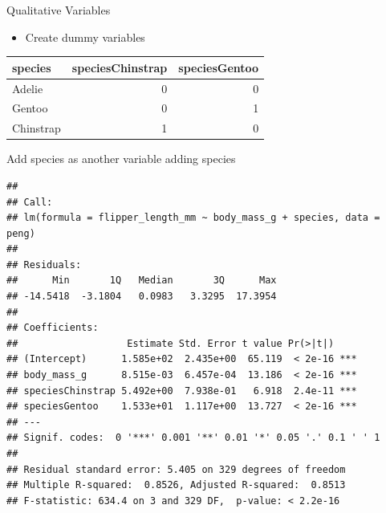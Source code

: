 \documentclass[
  ignorenonframetext,
]{beamer}
\providecommand{\tightlist}{%
  \setlength{\itemsep}{0pt}\setlength{\parskip}{0pt}}
\begin{document}
\begin{frame}{Qualitative Variables}
\protect\hypertarget{qualitative-variables}{}

\begin{itemize}
\tightlist
\item
  Create dummy variables
\end{itemize}

\begin{longtable}[]{@{}lrr@{}}
\toprule
species & speciesChinstrap & speciesGentoo\tabularnewline
\midrule
\endhead
Adelie & 0 & 0\tabularnewline
Gentoo & 0 & 1\tabularnewline
Chinstrap & 1 & 0\tabularnewline
\bottomrule
\end{longtable}

\end{frame}

\begin{frame}[fragile]{Add species as another variable \textbar{} adding
species}
\protect\hypertarget{add-species-as-another-variable-adding-species-1}{}

\begin{verbatim}
## 
## Call:
## lm(formula = flipper_length_mm ~ body_mass_g + species, data = peng)
## 
## Residuals:
##      Min       1Q   Median       3Q      Max 
## -14.5418  -3.1804   0.0983   3.3295  17.3954 
## 
## Coefficients:
##                   Estimate Std. Error t value Pr(>|t|)    
## (Intercept)      1.585e+02  2.435e+00  65.119  < 2e-16 ***
## body_mass_g      8.515e-03  6.457e-04  13.186  < 2e-16 ***
## speciesChinstrap 5.492e+00  7.938e-01   6.918  2.4e-11 ***
## speciesGentoo    1.533e+01  1.117e+00  13.727  < 2e-16 ***
## ---
## Signif. codes:  0 '***' 0.001 '**' 0.01 '*' 0.05 '.' 0.1 ' ' 1
## 
## Residual standard error: 5.405 on 329 degrees of freedom
## Multiple R-squared:  0.8526, Adjusted R-squared:  0.8513 
## F-statistic: 634.4 on 3 and 329 DF,  p-value: < 2.2e-16
\end{verbatim}

\end{frame}
\end{document}
